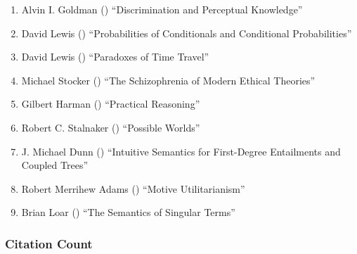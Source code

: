 \documentclass[
  10pt,
  letterpaper,
  DIV=11,
  numbers=noendperiod,
  twoside]{scrartcl}
\providecommand{\tightlist}{%
  \setlength{\itemsep}{0pt}\setlength{\parskip}{0pt}}\usepackage{longtable,booktabs,array}
\begin{document}
\begin{enumerate}
\def\labelenumi{\arabic{enumi}.}
\tightlist
\item
  Alvin I. Goldman ()
  ``Discrimination and Perceptual Knowledge''
\item
  David Lewis () ``Probabilities
  of Conditionals and Conditional Probabilities''
\item
  David Lewis () ``Paradoxes of
  Time Travel''
\item
  Michael Stocker () ``The
  Schizophrenia of Modern Ethical Theories''
\item
  Gilbert Harman () ``Practical
  Reasoning''
\item
  Robert C. Stalnaker ()
  ``Possible Worlds''
\item
  J. Michael Dunn () ``Intuitive
  Semantics for First-Degree Entailments and Coupled Trees''
\item
  Robert Merrihew Adams ()
  ``Motive Utilitarianism''
\item
  Brian Loar () ``The Semantics
  of Singular Terms''
\end{enumerate}

\subsubsection*{Citation Count}\label{sec-count-1976}
\end{document}
